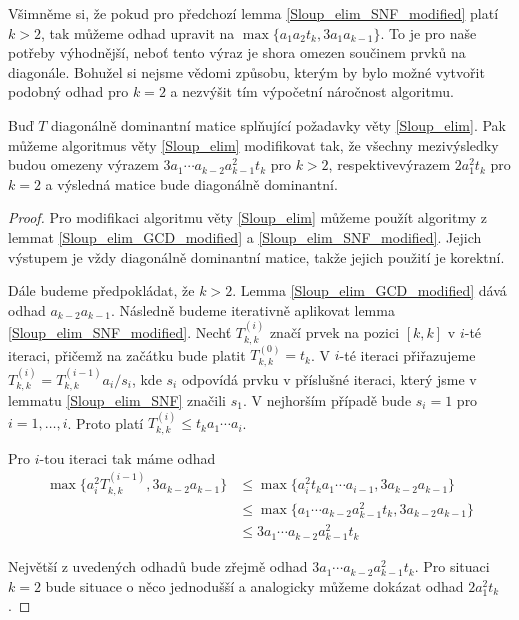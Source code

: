 \begin{pozn}
Všimněme si, že pokud pro předchozí lemma \ref{Sloup_elim_SNF_modified} platí
$ k > 2 $, tak můžeme odhad upravit na $ \max\{ a_1 a_2 t_k, 3 a_1 a_{k - 1} \} $.
To je pro naše potřeby výhodnější, neboť tento výraz je shora omezen součinem 
prvků na diagonále. Bohužel si nejsme vědomi způsobu, kterým by bylo možné 
vytvořit podobný odhad pro $ k = 2 $ a nezvýšit tím výpočetní náročnost
algoritmu.
\end{pozn}



\begin{lem} \label{Sloup_elim_modified}
Buď $ T $ diagonálně dominantní matice splňující požadavky věty \ref{Sloup_elim}.
Pak můžeme algoritmus věty \ref{Sloup_elim} modifikovat tak, že všechny
mezivýsledky budou omezeny výrazem $ 3 a_1 \cdots a_{k - 2} a_{k - 1}^2 t_k $ 
pro $ k > 2 $, respektivevýrazem $ 2 a_1^2 t_k $ pro $ k = 2 $ a výsledná matice 
bude diagonálně dominantní.
\end{lem}
\begin{proof}
Pro modifikaci algoritmu věty \ref{Sloup_elim} můžeme použít algoritmy z lemmat
\ref{Sloup_elim_GCD_modified} a \ref{Sloup_elim_SNF_modified}. Jejich výstupem
je vždy diagonálně dominantní matice, takže jejich použití je korektní.

Dále budeme předpokládat, že $ k > 2 $.
Lemma \ref{Sloup_elim_GCD_modified} dává odhad $ a_{k - 2} a_{k - 1} $. 
Následně budeme iterativně aplikovat lemma \ref{Sloup_elim_SNF_modified}.
Nechť $ T_{k,k}^{(i)} $ značí prvek na pozici $ [k, k] $ v $ i $-té iteraci, 
přičemž na začátku bude platit $ T_{k,k}^{(0)} = t_k $. V $ i $-té 
iteraci přiřazujeme $ T_{k,k}^{(i)} = T_{k,k}^{(i - 1)} a_i / s_i $, 
kde $ s_i $ odpovídá prvku v příslušné iteraci, který jsme v lemmatu 
\ref{Sloup_elim_SNF} značili $ s_1 $.
V nejhorším případě bude $ s_i = 1 $ pro $ i = 1, \dots, i $. Proto platí 
$ T_{k,k}^{(i)} \leq t_k a_1 \cdots a_i $. 

Pro $ i $-tou iteraci tak máme odhad 
\begin{align*}
\max\{ a_i^2 T_{k,k}^{(i - 1)}, 3 a_{k - 2} a_{k - 1} \} 
    & \leq \max\{ a_i^2 t_k a_1 \cdots a_{i - 1} , 3 a_{k - 2} a_{k - 1} \} \\
    & \leq \max\{ a_1 \cdots a_{k - 2} a_{k - 1}^2 t_k, 3 a_{k - 2} a_{k - 1} \} \\
    & \leq 3 a_1 \cdots a_{k - 2} a_{k - 1}^2 t_k
\end{align*}

Největší z uvedených odhadů bude zřejmě odhad $ 3 a_1 \cdots a_{k - 2} a_{k - 1}^2 t_k $.
Pro situaci $ k = 2 $ bude situace o něco jednodušší a analogicky můžeme dokázat
odhad $ 2 a_1^2 t_k $.
\end{proof}


